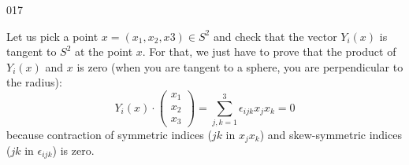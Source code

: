 \begin{corrige}{017}

Let us pick a point $x=(x_1,x_2,x3)\in S^2$ and check that the vector $Y_i(x)$ is tangent to $S^2$ at the point $x$. For that, we just have to prove that the product of $Y_i(x)$ and $x$ is zero (when you are tangent to a sphere, you are perpendicular to the radius):
\[ 
  Y_i(x)\cdot\begin{pmatrix}
x_1\\x_2\\x_3
\end{pmatrix}
=
\sum_{j,k=1}^{3}\epsilon_{ijk}x_jx_k=0
\]
because contraction of symmetric indices ($jk$ in $x_jx_k$) and skew-symmetric indices ($jk$ in $\epsilon_{ijk}$) is zero.


\end{corrige}
